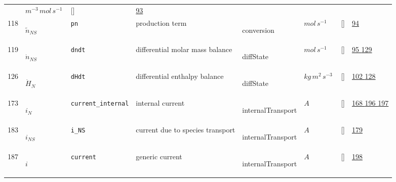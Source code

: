 \begin{longtable}{|p{1cm}|p{3cm}|p{3cm}|p{7cm}|p{3.0cm}|p{3cm}|p{2cm}|p{1cm}|}
             & $ m^{-3} \,mol \,s^{-1} \, $
             & []
             & \hyperlink{"e:93"}{ 93 }
                 \\
    118
             & \hypertarget{"v:118"}{ $ {\tilde{n}}{_{{N S}}} $}
             & \verb|pn|
             & production term
             & \begin{lay}conversion \end{lay}
             & $ mol \,s^{-1} \, $
             & []
             & \hyperlink{"e:94"}{ 94 }
                 \\
    119
             & \hypertarget{"v:119"}{ $ {\dot{n}}{_{{N S}}} $}
             & \verb|dndt|
             & differential molar mass balance
             & \begin{lay}diffState \end{lay}
             & $ mol \,s^{-1} \, $
             & []
             & \hyperlink{"e:95"}{ 95 }
                 \hyperlink{"e:129"}{ 129 }
                 \\
    126
             & \hypertarget{"v:126"}{ $ {\dot{H}}{_{N}} $}
             & \verb|dHdt|
             & differential enthalpy balance
             & \begin{lay}diffState \end{lay}
             & $ kg \,m^{2} \,s^{-3} \, $
             & []
             & \hyperlink{"e:102"}{ 102 }
                 \hyperlink{"e:128"}{ 128 }
                 \\
    173
             & \hypertarget{"v:173"}{ $ {i}{_{N}} $}
             & \verb|current_internal|
             & internal current
             & \begin{lay}internalTransport \end{lay}
             & $ A \, $
             & []
             & \hyperlink{"e:168"}{ 168 }
                 \hyperlink{"e:196"}{ 196 }
                 \hyperlink{"e:197"}{ 197 }
                 \\
    183
             & \hypertarget{"v:183"}{ $ {i}{_{{N S}}} $}
             & \verb|i_NS|
             & current due to species transport
             & \begin{lay}internalTransport \end{lay}
             & $ A \, $
             & []
             & \hyperlink{"e:179"}{ 179 }
                 \\
    187
             & \hypertarget{"v:187"}{ $ {i}{_{}} $}
             & \verb|current|
             & generic current
             & \begin{lay}internalTransport \end{lay}
             & $ A \, $
             & []
             & \hyperlink{"e:198"}{ 198 }
                 \\
    \end{longtable}